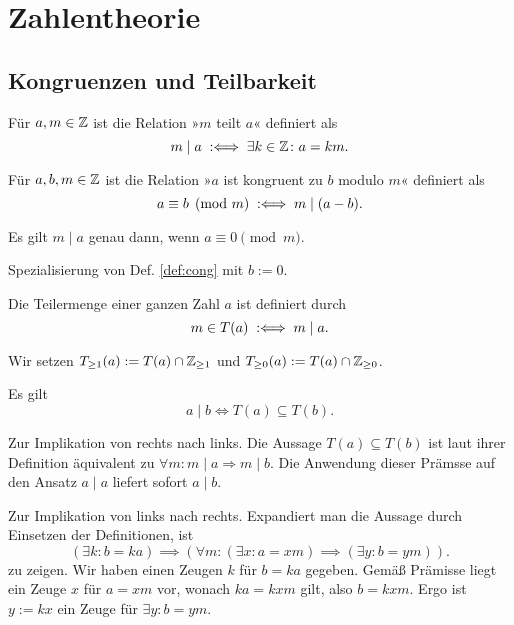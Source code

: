 
\chapter{Zahlentheorie}
\section{Kongruenzen und Teilbarkeit}

\begin{Definition}[Teiler] Für $a,m\in\mathbb Z$ ist die Relation »$m$ teilt
$a$« definiert als
\[m\mid a\;:\Longleftrightarrow\; \exists k\in\mathbb Z\colon a = km.\]
\end{Definition}

\begin{Definition}[Kongruenz]\label{def:cong}
Für $a,b,m\in\mathbb Z$ ist die Relation »$a$ ist kongruent zu $b$ modulo
$m$« definiert als
\[a\equiv b \pmod m \;:\Longleftrightarrow\; m\mid (a-b).\]
\end{Definition}

\begin{Satz}
Es gilt $m\mid a$ genau dann, wenn $a\equiv 0\pmod m$.
\end{Satz}
\begin{Beweis}
Spezialisierung von Def. \ref{def:cong} mit $b:=0$.\,\qedsymbol
\end{Beweis}

\begin{Definition}[Teilermenge] Die Teilermenge
einer ganzen Zahl $a$ ist definiert durch
\[m\in T(a)\;:\Longleftrightarrow\; m\mid a.\]
\end{Definition}
 Wir setzen $T_{\ge 1}(a):=T(a)\cap\mathbb Z_{\ge 1}$ und
$T_{\ge 0}(a):=T(a)\cap\mathbb Z_{\ge 0}$.

\begin{Satz}\label{divisor-divisor-subset} Es gilt
\[a\mid b \iff T(a)\subseteq T(b).\]
\end{Satz}
\begin{Beweis}
Zur Implikation von rechts nach links.
Die Aussage $T(a)\subseteq T(b)$ ist laut ihrer Definition
äquivalent zu $\forall m\colon m\mid a\Rightarrow m\mid b$.
Die Anwendung dieser Prämsse auf den Ansatz $a\mid a$
liefert sofort $a\mid b$.

Zur Implikation von links nach rechts. Expandiert man die Aussage
durch Einsetzen der Definitionen, ist
\[(\exists k\colon b=ka)\implies
(\forall m\colon (\exists x\colon a=xm)\implies (\exists y\colon b=ym)).\]
zu zeigen. Wir haben einen Zeugen $k$ für $b=ka$ gegeben. 
Gemäß Prämisse liegt ein Zeuge $x$ für $a=xm$ vor, wonach $ka=kxm$
gilt, also $b=kxm$. Ergo ist $y:=kx$ ein Zeuge für
$\exists y\colon b=ym$.\,\qedsymbol
\end{Beweis}

